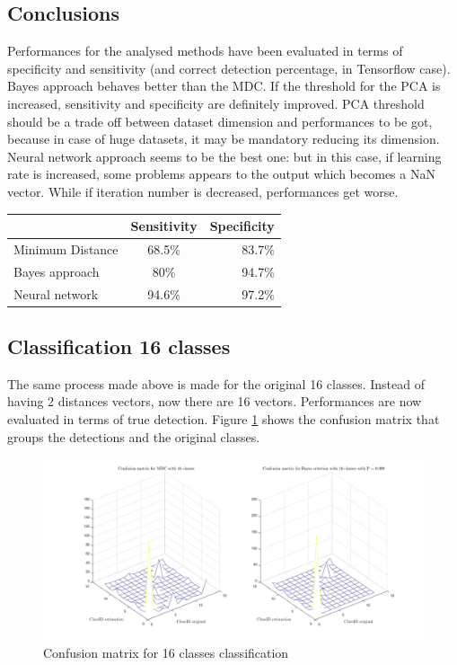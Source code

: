 \documentclass{article}
\begin{document}
\subsection{Conclusions}
Performances for the analysed methods have been evaluated in terms of specificity and sensitivity (and correct detection percentage, in Tensorflow case). Bayes approach behaves better than the MDC. If the threshold for the PCA is increased, sensitivity and specificity are definitely improved. PCA threshold should be a trade off between dataset dimension and performances to be got, because in case of huge datasets, it may be mandatory reducing its dimension. Neural network approach seems to be the best one: but in this case, if learning rate is increased, some problems appears to the output which becomes a NaN vector. While if iteration number is decreased, performances get worse. 

\begin{center}
  \begin{tabular}{ | l | c | r | }
    \hline
     & Sensitivity & Specificity \\ \hline
    Minimum Distance & 68.5\% & 83.7\% \\ \hline
    Bayes approach & 80\% & 94.7\% \\ \hline
    Neural network & 94.6\% & 97.2\% \\
    \hline
  \end{tabular}
\end{center}

\subsection{Classification 16 classes}
The same process made above is made for the original 16 classes. Instead of having 2 distances vectors, now there are 16 vectors. Performances are now evaluated in terms of true detection. Figure \ref{fig:confMat} shows the confusion matrix that groups the detections and the original classes. 

\begin{figure}[H]
	\centering
	\includegraphics[scale=0.4]{pictures/confMat.png}
	\caption{Confusion matrix for 16 classes classification}\label{fig:confMat}
\end{figure}
\end{document}
